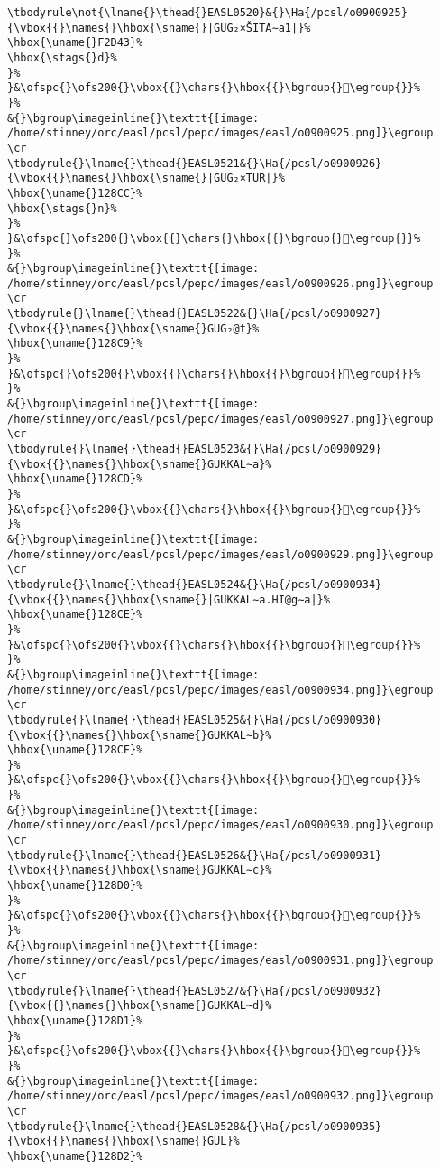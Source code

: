 \begin{verbatim}
\tbodyrule\not{\lname{}\thead{}EASL0520}&{}\Ha{/pcsl/o0900925}{\vbox{{}\names{}\hbox{\sname{}|GUG₂×ŠITA∼a1|}%
\hbox{\uname{}F2D43}%
\hbox{\stags{}d}%
}%
}&\ofspc{}\ofs200{}\vbox{{}\chars{}\hbox{{}\bgroup{}󲵃\egroup{}}%
}%
&{}\bgroup\imageinline{}\texttt{[image: /home/stinney/orc/easl/pcsl/pepc/images/easl/o0900925.png]}\egroup
\cr
\tbodyrule{}\lname{}\thead{}EASL0521&{}\Ha{/pcsl/o0900926}{\vbox{{}\names{}\hbox{\sname{}|GUG₂×TUR|}%
\hbox{\uname{}128CC}%
\hbox{\stags{}n}%
}%
}&\ofspc{}\ofs200{}\vbox{{}\chars{}\hbox{{}\bgroup{}𒣌\egroup{}}%
}%
&{}\bgroup\imageinline{}\texttt{[image: /home/stinney/orc/easl/pcsl/pepc/images/easl/o0900926.png]}\egroup
\cr
\tbodyrule{}\lname{}\thead{}EASL0522&{}\Ha{/pcsl/o0900927}{\vbox{{}\names{}\hbox{\sname{}GUG₂@t}%
\hbox{\uname{}128C9}%
}%
}&\ofspc{}\ofs200{}\vbox{{}\chars{}\hbox{{}\bgroup{}𒣉\egroup{}}%
}%
&{}\bgroup\imageinline{}\texttt{[image: /home/stinney/orc/easl/pcsl/pepc/images/easl/o0900927.png]}\egroup
\cr
\tbodyrule{}\lname{}\thead{}EASL0523&{}\Ha{/pcsl/o0900929}{\vbox{{}\names{}\hbox{\sname{}GUKKAL∼a}%
\hbox{\uname{}128CD}%
}%
}&\ofspc{}\ofs200{}\vbox{{}\chars{}\hbox{{}\bgroup{}𒣍\egroup{}}%
}%
&{}\bgroup\imageinline{}\texttt{[image: /home/stinney/orc/easl/pcsl/pepc/images/easl/o0900929.png]}\egroup
\cr
\tbodyrule{}\lname{}\thead{}EASL0524&{}\Ha{/pcsl/o0900934}{\vbox{{}\names{}\hbox{\sname{}|GUKKAL∼a.HI@g∼a|}%
\hbox{\uname{}128CE}%
}%
}&\ofspc{}\ofs200{}\vbox{{}\chars{}\hbox{{}\bgroup{}𒣎\egroup{}}%
}%
&{}\bgroup\imageinline{}\texttt{[image: /home/stinney/orc/easl/pcsl/pepc/images/easl/o0900934.png]}\egroup
\cr
\tbodyrule{}\lname{}\thead{}EASL0525&{}\Ha{/pcsl/o0900930}{\vbox{{}\names{}\hbox{\sname{}GUKKAL∼b}%
\hbox{\uname{}128CF}%
}%
}&\ofspc{}\ofs200{}\vbox{{}\chars{}\hbox{{}\bgroup{}𒣏\egroup{}}%
}%
&{}\bgroup\imageinline{}\texttt{[image: /home/stinney/orc/easl/pcsl/pepc/images/easl/o0900930.png]}\egroup
\cr
\tbodyrule{}\lname{}\thead{}EASL0526&{}\Ha{/pcsl/o0900931}{\vbox{{}\names{}\hbox{\sname{}GUKKAL∼c}%
\hbox{\uname{}128D0}%
}%
}&\ofspc{}\ofs200{}\vbox{{}\chars{}\hbox{{}\bgroup{}𒣐\egroup{}}%
}%
&{}\bgroup\imageinline{}\texttt{[image: /home/stinney/orc/easl/pcsl/pepc/images/easl/o0900931.png]}\egroup
\cr
\tbodyrule{}\lname{}\thead{}EASL0527&{}\Ha{/pcsl/o0900932}{\vbox{{}\names{}\hbox{\sname{}GUKKAL∼d}%
\hbox{\uname{}128D1}%
}%
}&\ofspc{}\ofs200{}\vbox{{}\chars{}\hbox{{}\bgroup{}𒣑\egroup{}}%
}%
&{}\bgroup\imageinline{}\texttt{[image: /home/stinney/orc/easl/pcsl/pepc/images/easl/o0900932.png]}\egroup
\cr
\tbodyrule{}\lname{}\thead{}EASL0528&{}\Ha{/pcsl/o0900935}{\vbox{{}\names{}\hbox{\sname{}GUL}%
\hbox{\uname{}128D2}%

\end{verbatim}
